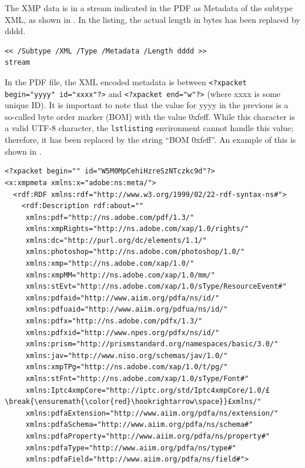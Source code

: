 The XMP data is in a stream indicated in the PDF as Metadata of the subtype XML, as shown in . In the listing, the actual length in bytes has been replaced by dddd.
\begin{lstlisting}[caption={PDF stream where the XMP is found}, label=lst:pdfXMPStream]
<< /Subtype /XML /Type /Metadata /Length dddd >>
stream
\end{lstlisting}

In the PDF file, the XML encoded metadata is between \texttt{<?xpacket begin="yyyy" id="xxxx"?>} and \texttt{<?xpacket end="w"?>} (where xxxx is some unique ID). It is important to note that the value for yyyy in the previous is a so-called byte order marker (BOM) with the value 0xfeff. While this character is a valid \mbox{UTF-8} character, the \texttt{lstlisting} environment cannot handle this value; therefore, it has been replaced by the string ``BOM 0xfeff''. An example of this is shown in .
\clearpage
\begin{lstlisting}[style=myXML,
caption={First part of the XML metadata embedded in a PDF file (some reformatting has been done to fit the text in the boarders)}, label={lst:pdfinfoOutput}]
<?xpacket begin="﻿" id="W5M0MpCehiHzreSzNTczkc9d"?>
<x:xmpmeta xmlns:x="adobe:ns:meta/">
  <rdf:RDF xmlns:rdf="http://www.w3.org/1999/02/22-rdf-syntax-ns#">
    <rdf:Description rdf:about=""
     xmlns:pdf="http://ns.adobe.com/pdf/1.3/"
     xmlns:xmpRights="http://ns.adobe.com/xap/1.0/rights/"
     xmlns:dc="http://purl.org/dc/elements/1.1/"
     xmlns:photoshop="http://ns.adobe.com/photoshop/1.0/"
     xmlns:xmp="http://ns.adobe.com/xap/1.0/"
     xmlns:xmpMM="http://ns.adobe.com/xap/1.0/mm/"
     xmlns:stEvt="http://ns.adobe.com/xap/1.0/sType/ResourceEvent#"
     xmlns:pdfaid="http://www.aiim.org/pdfa/ns/id/"
     xmlns:pdfuaid="http://www.aiim.org/pdfua/ns/id/"
     xmlns:pdfx="http://ns.adobe.com/pdfx/1.3/"
     xmlns:pdfxid="http://www.npes.org/pdfx/ns/id/"
     xmlns:prism="http://prismstandard.org/namespaces/basic/3.0/"
     xmlns:jav="http://www.niso.org/schemas/jav/1.0/"
     xmlns:xmpTPg="http://ns.adobe.com/xap/1.0/t/pg/"
     xmlns:stFnt="http://ns.adobe.com/xap/1.0/sType/Font#"
     xmlns:Iptc4xmpCore="http://iptc.org/std/Iptc4xmpCore/1.0/£\break{\ensuremath{\color{red}\hookrightarrow\space}}£xmlns/"
     xmlns:pdfaExtension="http://www.aiim.org/pdfa/ns/extension/"
     xmlns:pdfaSchema="http://www.aiim.org/pdfa/ns/schema#"
     xmlns:pdfaProperty="http://www.aiim.org/pdfa/ns/property#"
     xmlns:pdfaType="http://www.aiim.org/pdfa/ns/type#"
     xmlns:pdfaField="http://www.aiim.org/pdfa/ns/field#">
\end{lstlisting}

